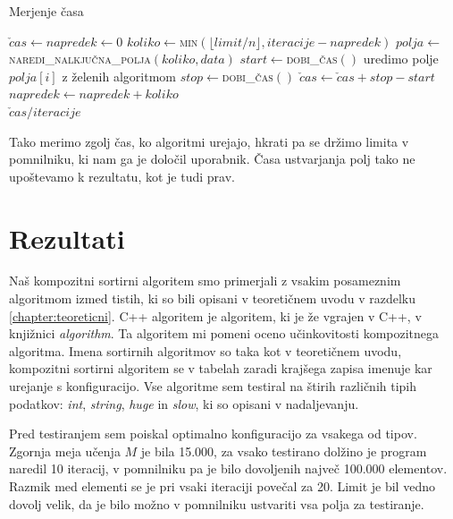 \documentclass[a4paper,oneside,12pt]{article}
\begin{document}
\begin{algorithm}
  \caption{Merjenje časa}\label{algo:time}
  \begin{algorithmic}[1]
    \State \label{line:init} $\check{c}as \gets napredek \gets 0$
    \Repeat \label{line:repeattimestart}
      \State \label{line:koliko} $koliko \gets $\textsc{min}$(\lfloor limit / n \rfloor, iteracije - napredek)$
      \State \label{line:polja} $polja \gets $\textsc{naredi\_nalkjučna\_polja}$(koliko, data)$
      \State \label{line:getstarttime} $start \gets $\textsc{dobi\_čas}$()$
       \label{line:beginsortfor}
        \State uredimo polje $polja[i]$ z želenih algoritmom
      \EndFor \label{line:endsortfor}
      \State \label{line:getendtime} $stop \gets $\textsc{dobi\_čas}$()$
      \State $\check{c}as \gets \check{c}as + stop - start$
      \State $napredek \gets napredek + koliko$
     \label{line:repeattimeend} \\
    \Return \label{line:returnaverage}$\check{c}as / iteracije$
  \end{algorithmic}
\end{algorithm}
Tako merimo zgolj čas, ko algoritmi urejajo, hkrati pa se držimo limita v pomnilniku, ki
nam ga je določil uporabnik. Časa ustvarjanja polj tako ne upoštevamo k rezultatu, kot
je tudi prav.

\section{Rezultati}
Naš kompozitni sortirni algoritem smo primerjali z vsakim posameznim algoritmom izmed
tistih, ki so bili opisani v teoretičnem uvodu v razdelku \ref{chapter:teoreticni}. C++ algoritem
je algoritem, ki je že vgrajen v C++, v knjižnici \emph{algorithm}. Ta algoritem mi pomeni oceno
učinkovitosti kompozitnega algoritma.
Imena sortirnih algoritmov so taka kot v teoretičnem uvodu, kompozitni sortirni algoritem se v tabelah 
zaradi krajšega zapisa imenuje kar urejanje s konfiguracijo.
Vse algoritme sem testiral na štirih različnih tipih podatkov: 
\emph{int}, \emph{string}, \emph{huge} in \emph{slow}, ki so opisani v nadaljevanju.

Pred testiranjem sem poiskal optimalno konfiguracijo za vsakega od tipov. Zgornja meja
učenja $M$ je bila 15.000, za vsako testirano dolžino je program naredil 10 iteracij, v pomnilniku
pa je bilo dovoljenih največ 100.000 elementov. Razmik med elementi se je pri vsaki iteraciji povečal za 20.
Limit je bil vedno dovolj velik, da je bilo možno v pomnilniku ustvariti vsa polja za testiranje.
\end{document}
